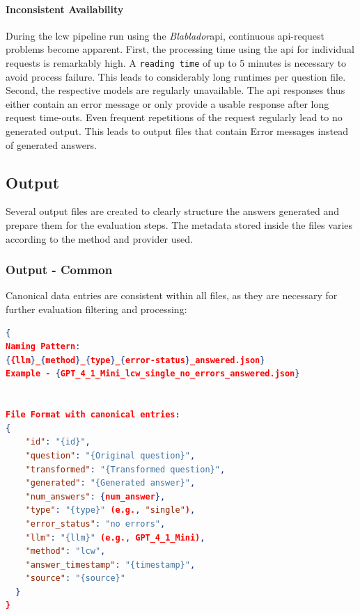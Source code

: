 \paragraph{Inconsistent Availability}\label{par:inconsistent_blablador}
During the \ac{lcw} pipeline run using the \textit{Blablador}\ac{api}, continuous \ac{api}-request problems become apparent.
First, the processing time using the \ac{api} for individual requests is remarkably high.
A \texttt{reading time} of up to 5 minutes is necessary to avoid process failure.
This leads to considerably long runtimes per question file.
Second, the respective models are regularly unavailable.
The \ac{api} responses thus either contain an error message or only provide a usable response after long request time-outs.
Even frequent repetitions of the request regularly lead to no generated output.
This leads to output files that contain Error messages instead of generated answers.
%
\subsection{Output}\label{subsub:output_generated}
%
Several output files are created to clearly structure the answers generated and prepare them for the evaluation steps.
%
The metadata stored inside the files varies according to the method and provider used. 
%
\subsubsection{Output - Common}\label{subsub:output_generated_or}

Canonical data entries are consistent within all files, as they are necessary for further evaluation filtering and processing:
\begin{lstlisting}[language=json, caption={*\_answered.json File Structure, Method "lcw"}, label={lst:output_file_structure_answered_lcw_common}]
{
Naming Pattern:
{{llm}_{method}_{type}_{error-status}_answered.json}
Example - {GPT_4_1_Mini_lcw_single_no_errors_answered.json}


File Format with canonical entries:
{
    "id": "{id}",
    "question": "{Original question}",
    "transformed": "{Transformed question}",
    "generated": "{Generated answer}",
    "num_answers": {num_answer},
    "type": "{type}" (e.g., "single"),
    "error_status": "no errors",
    "llm": "{llm}" (e.g., GPT_4_1_Mini),
    "method": "lcw",
    "answer_timestamp": "{timestamp}",
    "source": "{source}" 
  }
}
\end{lstlisting}

